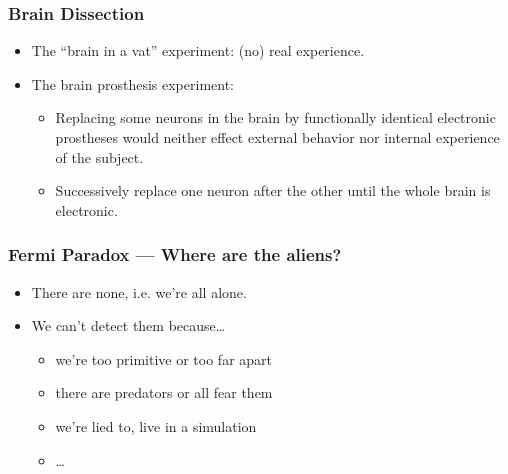 \documentclass[UTF8,11pt,colorlinks,compress,openany]{beamer}%
\begin{document}
\begin{frame}\frametitle{Brain Dissection}
\begin{itemize}
	\item The ``brain in a vat'' experiment: (no) real experience.
	\item The brain prosthesis experiment:
		\begin{itemize}
			\item Replacing some neurons in the brain by functionally identical electronic prostheses would neither effect external behavior nor internal experience of the subject.
			\item Successively replace one neuron after the other until the whole brain is electronic.
		\end{itemize}
\end{itemize}
\end{frame}

\begin{frame}\frametitle{Fermi Paradox --- Where are the aliens?}
\begin{itemize}
	\item There are none, i.e. we're all alone.
	\item We can't detect them because\dots
		\begin{itemize}
			\item we're too primitive or too far apart
			\item there are predators or all fear them
			\item we're lied to, live in a simulation
			\item \dots
		\end{itemize}
\end{itemize}
\end{frame}
\end{document}
